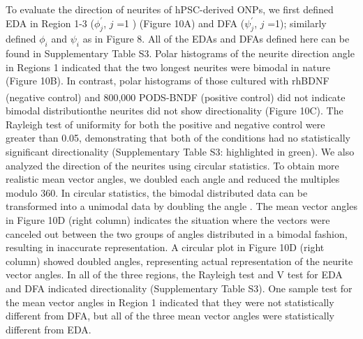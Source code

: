 \documentclass[review]{elsarticle}
\begin{document}
To evaluate the direction of neurites of hPSC-derived ONPs, we first defined EDA in Region 1-3 ($\phi^{\prime}_{j}$, $j$ =1 ) (Figure 10A) and DFA ($\psi^{\prime}_{j}$, $j$ =1); similarly defined $\phi_{i}$ and $\psi_{i}$ as in Figure 8. All of the EDAs and DFAs defined here can be found in Supplementary Table S3. Polar histograms of the neurite direction angle in Regions 1 indicated that the two longest neurites were bimodal in nature (Figure 10B).  In contrast, polar histograms of those cultured with rhBDNF (negative control) and 800,000 PODS\textsuperscript{\textregistered}-BNDF (positive control) did not indicate bimodal distribution\textemdash the neurites did not show directionality (Figure 10C). The Rayleigh test of uniformity for both the positive and negative control were greater than 0.05, demonstrating that both of the conditions had no statistically significant directionality (Supplementary Table S3: highlighted in green). We also analyzed the direction of the neurites using circular statistics. To obtain more realistic mean vector angles, we doubled each angle and reduced the multiples modulo 360\degree. In circular statistics, the bimodal distributed data can be transformed into a unimodal data by doubling the angle \cite{Batschelet1981}. The mean vector angles in Figure 10D (right column) indicates the situation where the vectors were canceled out between the two groups of angles distributed in a bimodal fashion, resulting in inaccurate representation. A circular plot in Figure 10D (right column) showed doubled angles, representing actual representation of the neurite vector angles. In all of the three regions, the Rayleigh test and V test for EDA and DFA indicated directionality (Supplementary Table S3). One sample test for the mean vector angles in Region 1 indicated that they were not statistically different from DFA, but all of the three mean vector angles were statistically different from EDA. 
\end{document}
